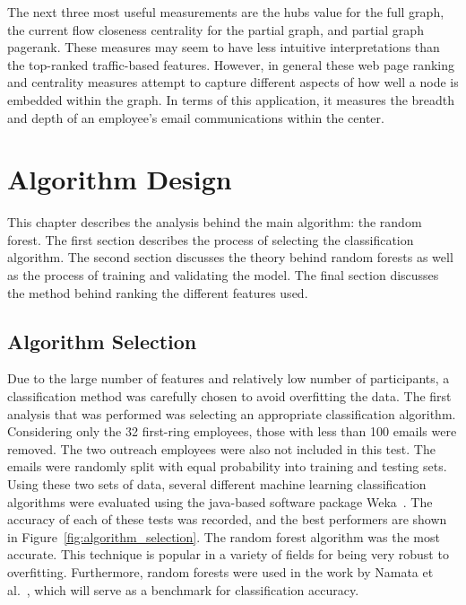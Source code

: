 \documentclass[12pt]{report}
\begin{document}
The next three most useful measurements are the hubs value for the full graph, the current flow closeness centrality for the partial graph, and partial graph pagerank.
These measures may seem to have less intuitive interpretations than the top-ranked traffic-based features.
However, in general these web page ranking and centrality measures attempt to capture different aspects of how well a node is embedded within the graph.
In terms of this application, it measures the breadth and depth of an employee's email communications within the center.

\chapter{Algorithm Design} \label{Algorithm}
This chapter describes the analysis behind the main algorithm: the random forest.
The first section describes the process of selecting the classification algorithm.
The second section discusses the theory behind random forests as well as the process of training and validating the model.
The final section discusses the method behind ranking the different features used.

\section{Algorithm Selection}
Due to the large number of features and relatively low number of participants, a classification method was carefully chosen to avoid overfitting the data.
The first analysis that was performed was selecting an appropriate classification algorithm.
Considering only the 32 first-ring employees, those with less than 100 emails were removed.
The two outreach employees were also not included in this test.
The emails were randomly split with equal probability into training and testing sets.
Using these two sets of data, several different machine learning classification algorithms were evaluated using the java-based software package Weka~\cite{hall2009weka}.
The accuracy of each of these tests was recorded, and the best performers are shown in Figure~\ref{fig:algorithm_selection}.
The random forest algorithm was the most accurate.
This technique is popular in a variety of fields for being very robust to overfitting.
Furthermore, random forests were used in the work by Namata et al.~\cite{namata_inferring_2006}, which will serve as a benchmark for classification accuracy.
\end{document}
